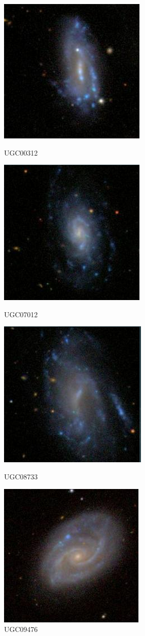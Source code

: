 \documentclass[9pt]{revtex4-1}
\begin{document}
\begin{figure}[h!]
\includegraphics[scale=0.3]{UGC00312.png}
\caption{UGC00312}
\includegraphics[scale=0.3]{UGC07012.png}
\caption{UGC07012}
\includegraphics[scale=0.3]{UGC08733.png}
\caption{UGC08733}
\includegraphics[scale=0.3]{UGC09476.png}
\caption{UGC09476}
\end{figure}
\end{document}

